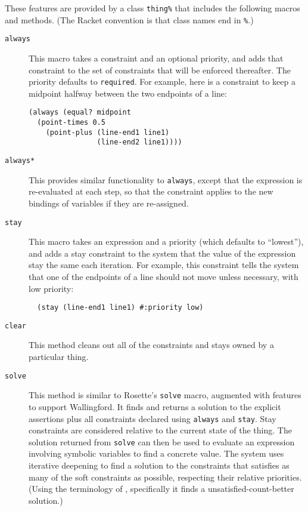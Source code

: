 \documentclass[reprint]{sigplanconf}
\begin{document}
These features are provided by a class \verb|thing%| that includes the
following macros and methods.  (The Racket convention is that class
names end in {\tt \%}.)

\begin{description}

\item[{\tt always}] This macro takes a constraint and an optional
  priority, and adds that constraint to the set of constraints that will be
  enforced thereafter.  The priority defaults to {\tt required}.  For
  example, here is a constraint to keep a midpoint halfway between the two
  endpoints of a line:

\begin{verbatim}
(always (equal? midpoint 
  (point-times 0.5
    (point-plus (line-end1 line1)
                (line-end2 line1))))
\end{verbatim}

\item[{\tt always*}] This provides similar functionality to
  \verb|always|, except that the expression is re-evaluated at each
  step, so that the constraint applies to the new bindings of
  variables if they are re-assigned.

\item[{\tt stay}] This macro takes an expression and a priority (which
  defaults to ``lowest''), and adds a stay constraint to the system that
  the value of the expression stay the same each iteration.  For example,
  this constraint tells the system that one of the endpoints of a line
  should not move unless necessary, with low priority:

  \begin{verbatim}
  (stay (line-end1 line1) #:priority low)
  \end{verbatim}

\item[{\tt clear}]  This method cleans out all of the constraints
  and stays owned by a particular thing.

\item[{\tt solve}] This method is similar to Rosette's {\tt solve}
  macro, augmented with features to support Wallingford.  It finds and
  returns a solution to the explicit assertions plus all constraints
  declared using \verb|always| and \verb|stay|.  Stay constraints are
  considered relative to the current state of the thing.  The solution
  returned from {\tt solve} can then be used to evaluate an
  expression involving symbolic variables to find a concrete value.  The
  system uses iterative deepening to find a solution to the constraints
  that satisfies as many of the soft constraints as possible, respecting
  their relative priorities.  (Using the terminology of
  \cite{borning-lisp-symbolic-computation-1992}, specifically it finds a
  unsatisfied-count-better solution.)

\end{description}
\end{document}

